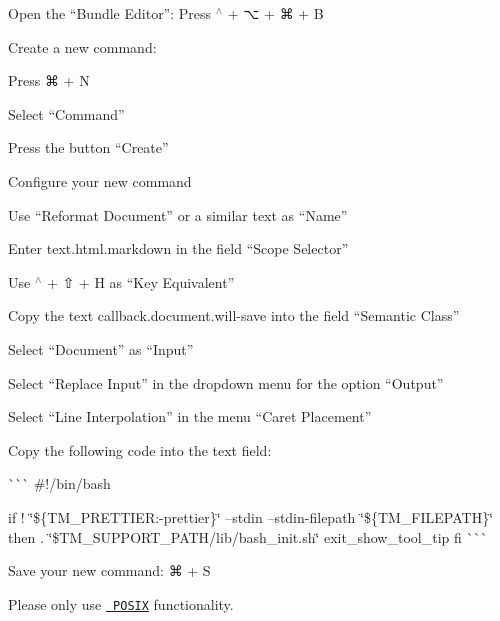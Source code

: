 \begin{DoxyEnumerate}
\item Open the “\+Bundle Editor”\+: Press {\ttfamily $^\wedge$} + {\ttfamily ⌥} + {\ttfamily ⌘} + {\ttfamily B}
\item Create a new command\+:
\begin{DoxyEnumerate}
\item Press {\ttfamily ⌘} + {\ttfamily N}
\item Select “\+Command”
\item Press the button “\+Create”
\end{DoxyEnumerate}
\item Configure your new command
\begin{DoxyEnumerate}
\item Use “\+Reformat Document” or a similar text as “\+Name”
\item Enter {\ttfamily text.\+html.\+markdown} in the field “\+Scope Selector”
\item Use {\ttfamily $^\wedge$} + {\ttfamily ⇧} + {\ttfamily H} as “\+Key Equivalent”
\item Copy the text {\ttfamily callback.\+document.\+will-\/save} into the field “\+Semantic Class”
\item Select “\+Document” as “\+Input”
\item Select “\+Replace Input” in the dropdown menu for the option “\+Output”
\item Select “\+Line Interpolation” in the menu “\+Caret Placement”
\item Copy the following code into the text field\+:

\`{}\`{}\`{} \#!/bin/bash

if ! \char`\"{}\$\{\+T\+M\+\_\+\+P\+R\+E\+T\+T\+I\+E\+R\+:-\/prettier\}\char`\"{} --stdin --stdin-\/filepath \char`\"{}\$\{\+T\+M\+\_\+\+F\+I\+L\+E\+P\+A\+T\+H\}\char`\"{} then . \char`\"{}\$\+T\+M\+\_\+\+S\+U\+P\+P\+O\+R\+T\+\_\+\+P\+A\+T\+H/lib/bash\+\_\+init.\+sh\char`\"{} exit\+\_\+show\+\_\+tool\+\_\+tip fi \`{}\`{}\`{}
\item Save your new command\+: {\ttfamily ⌘} + {\ttfamily S}
\end{DoxyEnumerate}
\end{DoxyEnumerate}


\begin{DoxyItemize}
\item Please only use \href{https://en.wikipedia.org/wiki/POSIX}{\texttt{ P\+O\+S\+IX}} functionality.
\end{DoxyItemize}

